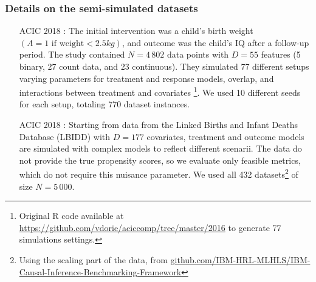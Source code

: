 \documentclass[a4paper,num-refs]{oup-contemporary}%
\begin{document}
\subsubsection{ Details on the semi-simulated datasets}\label{apd:experiments:datasets}


\begin{itemize}
    \item[ACIC 2018] \cite{dorie_automated_2019}:  The initial intervention was a child’s birth
          weight $(A = 1 \text{ if weight} < 2.5 kg)$, and outcome was the child’s
          IQ after a follow-up period. The study contained $N=4\,802$ data
          points with $D=55$ features (5 binary, 27 count data, and 23
          continuous). They simulated 77 different setups varying parameters
          for treatment and response models, overlap, and interactions between treatment and
          covariates \footnote{Original R code available at
              \url{https://github.com/vdorie/aciccomp/tree/master/2016}
              to generate 77 simulations settings.}. We used 10 different seeds
          for each setup, totaling 770 dataset instances.

    \item[ACIC 2018] \cite{shimoni_benchmarking_2018}: Starting from data from
          the Linked Births and Infant Deaths Database (LBIDD)
          \cite{macdorman_infant_1998} with $D=177$ covariates, treatment and
          outcome models are simulated with complex models to reflect different
          scenarii. The data do not provide the true propensity scores, so we
          evaluate only feasible metrics, which do not require this nuisance
          parameter. We used all 432 datasets\footnote{Using the scaling part of
              the data, from
              \href{https://github.com/IBM-HRL-MLHLS/IBM-Causal-Inference-Benchmarking-Framework}{github.com/IBM-HRL-MLHLS/IBM-Causal-Inference-Benchmarking-Framework}}
          of size $N=5\,000$.



\end{itemize}
\end{document}
